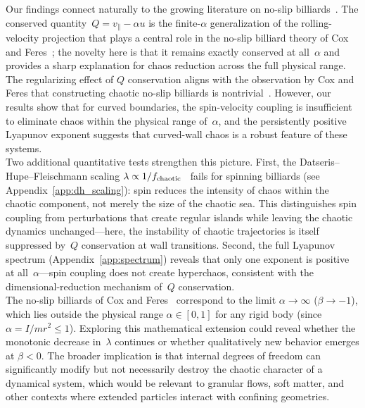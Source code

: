 \documentclass[aps,prd,twocolumn,superscriptaddress,nofootinbib,floatfix]{revtex4-2}
\begin{document}
Our findings connect naturally to the growing literature on no-slip billiards~\cite{broomhead1993,cox2017,cox2018,cox2022,cox2021,cox2026}. The conserved quantity~$Q = v_\parallel - \alpha u$ is the finite-$\alpha$ generalization of the rolling-velocity projection that plays a central role in the no-slip billiard theory of Cox and Feres~\cite{cox2017,cox2021}; the novelty here is that it remains exactly conserved at all~$\alpha$ and provides a sharp explanation for chaos reduction across the full physical range. The regularizing effect of $Q$ conservation aligns with the observation by Cox and Feres that constructing chaotic no-slip billiards is nontrivial~\cite{cox2022}. However, our results show that for curved boundaries, the spin-velocity coupling is insufficient to eliminate chaos within the physical range of~$\alpha$, and the persistently positive Lyapunov exponent suggests that curved-wall chaos is a robust feature of these systems.\\

\noindent
Two additional quantitative tests strengthen this picture. First, the Datseris--Hupe--Fleischmann scaling $\lambda \propto 1/f_{\rm chaotic}$~\cite{datseris2019} fails for spinning billiards (see Appendix~\ref{app:dh_scaling}): spin reduces the intensity of chaos within the chaotic component, not merely the size of the chaotic sea. This distinguishes spin coupling from perturbations that create regular islands while leaving the chaotic dynamics unchanged---here, the instability of chaotic trajectories is itself suppressed by~$Q$ conservation at wall transitions. Second, the full Lyapunov spectrum (Appendix~\ref{app:spectrum}) reveals that only one exponent is positive at all~$\alpha$---spin coupling does not create hyperchaos, consistent with the dimensional-reduction mechanism of~$Q$ conservation.\\

\noindent
The no-slip billiards of Cox and Feres~\cite{cox2017,cox2021,cox2026} correspond to the limit $\alpha \to \infty$ ($\beta \to -1$), which lies outside the physical range $\alpha \in [0,1]$ for any rigid body (since $\alpha = I/mr^2 \leq 1$). Exploring this mathematical extension could reveal whether the monotonic decrease in~$\lambda$ continues or whether qualitatively new behavior emerges at $\beta < 0$. The broader implication is that internal degrees of freedom can significantly modify but not necessarily destroy the chaotic character of a dynamical system, which would be relevant to granular flows, soft matter, and other contexts where extended particles interact with confining geometries.\\
\end{document}
